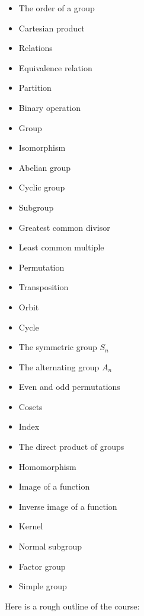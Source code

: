 \begin{itemize}
\tightlist
\item
  The order of a group
\item
  Cartesian product
\item
  Relations
\item
  Equivalence relation
\item
  Partition
\item
  Binary operation
\item
  Group
\item
  Isomorphism
\item
  Abelian group
\item
  Cyclic group
\item
  Subgroup
\item
  Greatest common divisor
\item
  Least common multiple
\item
  Permutation
\item
  Transposition
\item
  Orbit
\item
  Cycle
\item
  The symmetric group \(S_{n}\)
\item
  The alternating group \(A_{n}\)
\item
  Even and odd permutations
\item
  Cosets
\item
  Index
\item
  The direct product of groups
\item
  Homomorphism
\item
  Image of a function
\item
  Inverse image of a function
\item
  Kernel
\item
  Normal subgroup
\item
  Factor group
\item
  Simple group
\end{itemize}

Here is a rough outline of the course:

